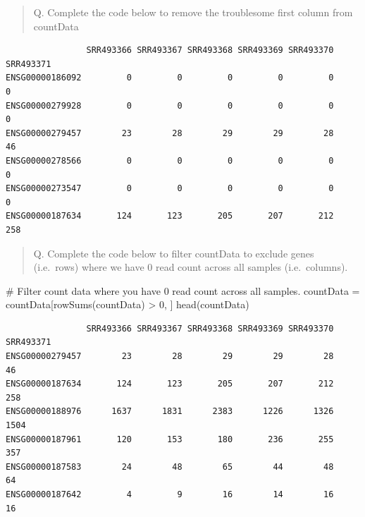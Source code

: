 \documentclass[
  letterpaper,
  DIV=11,
  numbers=noendperiod]{scrartcl}
\newenvironment{Shaded}{\begin{snugshade}}{\end{snugshade}}
\newcommand{\CommentTok}[1]{\textcolor[rgb]{0.37,0.37,0.37}{#1}}
\newcommand{\DecValTok}[1]{\textcolor[rgb]{0.68,0.00,0.00}{#1}}
\newcommand{\FunctionTok}[1]{\textcolor[rgb]{0.28,0.35,0.67}{#1}}
\newcommand{\NormalTok}[1]{\textcolor[rgb]{0.00,0.23,0.31}{#1}}
\newcommand{\OtherTok}[1]{\textcolor[rgb]{0.00,0.23,0.31}{#1}}
\newcommand{\SpecialCharTok}[1]{\textcolor[rgb]{0.37,0.37,0.37}{#1}}
\begin{document}
\begin{quote}
Q. Complete the code below to remove the troublesome first column from
countData
\end{quote}

\begin{Shaded}
\end{Shaded}

\begin{verbatim}
                SRR493366 SRR493367 SRR493368 SRR493369 SRR493370 SRR493371
ENSG00000186092         0         0         0         0         0         0
ENSG00000279928         0         0         0         0         0         0
ENSG00000279457        23        28        29        29        28        46
ENSG00000278566         0         0         0         0         0         0
ENSG00000273547         0         0         0         0         0         0
ENSG00000187634       124       123       205       207       212       258
\end{verbatim}

\begin{quote}
Q. Complete the code below to filter countData to exclude genes
(i.e.~rows) where we have 0 read count across all samples
(i.e.~columns).
\end{quote}

\begin{Shaded}
\begin{Highlighting}[]
\CommentTok{\# Filter count data where you have 0 read count across all samples.}
\NormalTok{countData }\OtherTok{=}\NormalTok{ countData[}\FunctionTok{rowSums}\NormalTok{(countData) }\SpecialCharTok{\textgreater{}} \DecValTok{0}\NormalTok{, ]}
\FunctionTok{head}\NormalTok{(countData)}
\end{Highlighting}
\end{Shaded}

\begin{verbatim}
                SRR493366 SRR493367 SRR493368 SRR493369 SRR493370 SRR493371
ENSG00000279457        23        28        29        29        28        46
ENSG00000187634       124       123       205       207       212       258
ENSG00000188976      1637      1831      2383      1226      1326      1504
ENSG00000187961       120       153       180       236       255       357
ENSG00000187583        24        48        65        44        48        64
ENSG00000187642         4         9        16        14        16        16
\end{verbatim}
\end{document}
